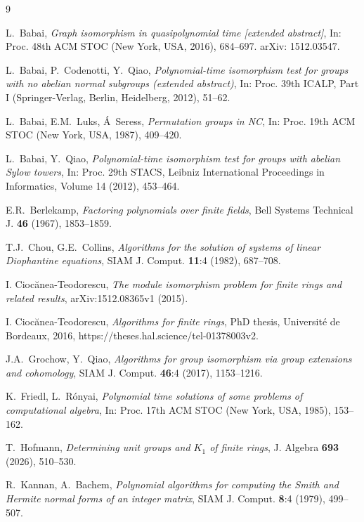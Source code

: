 \documentclass{article}
\begin{document}
\begin{thebibliography}{9}

	L.~Babai, \emph{Graph isomorphism in quasipolynomial time [extended abstract]},
	In: Proc. 48th ACM STOC (New York, USA, 2016), 684--697. arXiv: 1512.03547.

	L.~Babai, P.~Codenotti, Y.~Qiao,
	\emph{Polynomial-time isomorphism test for groups with no abelian normal subgroups (extended abstract)},
	In: Proc. 39th ICALP, Part I (Springer-Verlag, Berlin, Heidelberg, 2012), 51--62.

	L.~Babai, E.M.~Luks, \'A~Seress, \emph{Permutation groups in NC}, In: Proc. 19th ACM STOC (New York, USA, 1987), 409--420.

	L.~Babai, Y.~Qiao,
	\emph{Polynomial-time isomorphism test for groups with abelian Sylow towers},
	In: Proc. 29th STACS, Leibniz International Proceedings in Informatics, Volume 14 (2012), 453--464.

	E.R.~Berlekamp, \emph{Factoring polynomials over finite fields}, Bell Systems Technical J. \textbf{46} (1967), 1853--1859.

	T.J.~Chou, G.E.~Collins, \emph{Algorithms for the solution of systems of linear Diophantine equations},
	SIAM J. Comput. \textbf{11}:4 (1982), 687--708.
	
	I. Cioc\u{a}nea-Teodorescu, \emph{The module isomorphism problem for finite rings and related results}, arXiv:1512.08365v1 (2015).

	I. Cioc\u{a}nea-Teodorescu, \emph{Algorithms for finite rings}, PhD thesis, Universit\'e de Bordeaux, 2016, https://theses.hal.science/tel-01378003v2.

	J.A.~Grochow, Y.~Qiao,
	\emph{Algorithms for group isomorphism via group extensions and cohomology},
	SIAM J. Comput. \textbf{46}:4 (2017), 1153--1216.

	K.~Friedl, L.~R\'onyai, \emph{Polynomial time solutions of some problems of computational algebra}, In: Proc. 17th ACM STOC (New York, USA, 1985), 153--162.

	T.~Hofmann, \emph{Determining unit groups and \( K_1 \) of finite rings}, J. Algebra \textbf{693} (2026), 510--530.

	R.~Kannan, A.~Bachem, \emph{Polynomial algorithms for computing the Smith and Hermite normal forms of an integer matrix},
	SIAM J. Comput. \textbf{8}:4 (1979), 499--507.
	

\end{thebibliography}
\end{document}

